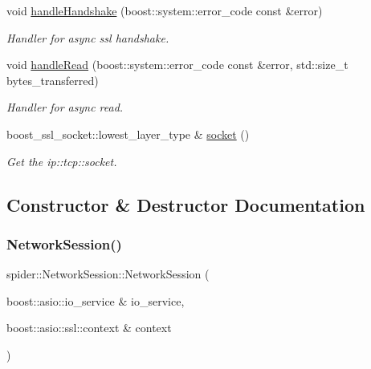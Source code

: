 \begin{DoxyCompactItemize}
void \hyperlink{classspider_1_1_network_session_afeb40632e9a388efbb4bb575f8eec76a}{handle\+Handshake} (boost\+::system\+::error\+\_\+code const \&error)
\begin{DoxyCompactList}\small\item\em Handler for async ssl handshake. \end{DoxyCompactList}\item 
void \hyperlink{classspider_1_1_network_session_a440bcc8bd0a5403a1b98dcd84ceb8aa3}{handle\+Read} (boost\+::system\+::error\+\_\+code const \&error, std\+::size\+\_\+t bytes\+\_\+transferred)
\begin{DoxyCompactList}\small\item\em Handler for async read. \end{DoxyCompactList}\item 
boost\+\_\+ssl\+\_\+socket\+::lowest\+\_\+layer\+\_\+type \& \hyperlink{classspider_1_1_network_session_a3a45370fb7c131566c903c3a23366a9f}{socket} ()
\begin{DoxyCompactList}\small\item\em Get the ip\+::tcp\+::socket. \end{DoxyCompactList}\end{DoxyCompactItemize}


\subsection{Constructor \& Destructor Documentation}
\mbox{\label{classspider_1_1_network_session_a1049001c94e30b57a9986a1ec26d1b0c}} 
\subsubsection{\texorpdfstring{Network\+Session()}{NetworkSession()}}
{\footnotesize\ttfamily spider\+::\+Network\+Session\+::\+Network\+Session (\begin{DoxyParamCaption}\item[{boost\+::asio\+::io\+\_\+service \&}]{io\+\_\+service,  }\item[{boost\+::asio\+::ssl\+::context \&}]{context }\end{DoxyParamCaption})}



